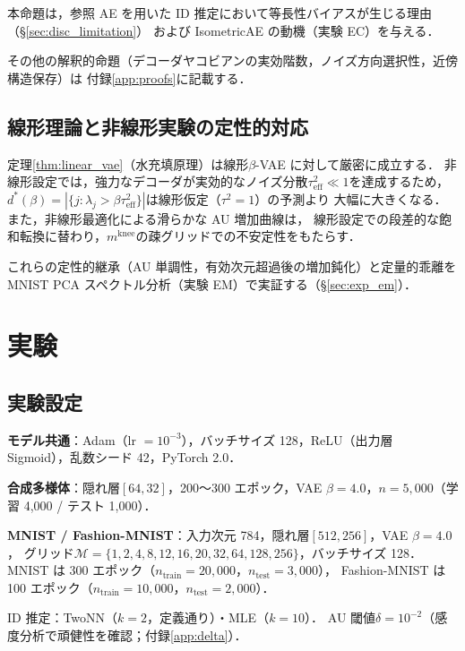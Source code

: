 \documentclass[11pt,a4paper]{jsarticle}
\newcommand{\mknee}{m^{\mathrm{knee}}}
\begin{document}
本命題は，参照 AE を用いた ID 推定において等長性バイアスが生じる理由（§\ref{sec:disc_limitation}）
および IsometricAE の動機（実験 EC）を与える．

その他の解釈的命題（デコーダヤコビアンの実効階数，ノイズ方向選択性，近傍構造保存）は
付録\ref{app:proofs}に記載する．

\subsection{線形理論と非線形実験の定性的対応}\label{sec:theory_bridge}

定理\ref{thm:linear_vae}（水充填原理）は線形$\beta$-VAE に対して厳密に成立する．
非線形設定では，強力なデコーダが実効的なノイズ分散$\tau^2_\mathrm{eff} \ll 1$を達成するため，
$d^*(\beta) = |\{j : \lambda_j > \beta\tau^2_\mathrm{eff}\}|$は線形仮定（$\tau^2=1$）の予測より
大幅に大きくなる．また，非線形最適化による滑らかな AU 増加曲線は，
線形設定での段差的な飽和転換に替わり，$\mknee$の疎グリッドでの不安定性をもたらす．

これらの定性的継承（AU 単調性，有効次元超過後の増加鈍化）と定量的乖離を
MNIST PCA スペクトル分析（実験 EM）で実証する（§\ref{sec:exp_em}）．

\section{実験}\label{sec:exp}

\subsection{実験設定}\label{sec:exp_setup}

\textbf{モデル共通}：Adam（lr $= 10^{-3}$），バッチサイズ 128，ReLU（出力層 Sigmoid），乱数シード 42，PyTorch 2.0．

\textbf{合成多様体}：隠れ層$[64, 32]$，200〜300 エポック，VAE $\beta = 4.0$，$n = 5{,}000$（学習 4,000 / テスト 1,000）．

\textbf{MNIST / Fashion-MNIST}：入力次元 784，隠れ層$[512, 256]$，VAE $\beta = 4.0$，
グリッド$\mathcal{M} = \{1,2,4,8,12,16,20,32,64,128,256\}$，バッチサイズ 128．
MNIST は 300 エポック（$n_{\mathrm{train}} = 20{,}000$，$n_{\mathrm{test}} = 3{,}000$），
Fashion-MNIST は 100 エポック（$n_{\mathrm{train}} = 10{,}000$，$n_{\mathrm{test}} = 2{,}000$）．

ID 推定：TwoNN（$k=2$，定義通り）・MLE（$k=10$）\cite{facco2017twonn,levina2005mle}．
AU 閾値$\delta = 10^{-2}$\cite{lucas2019elbo}（感度分析で頑健性を確認；付録\ref{app:delta}）．
\end{document}
